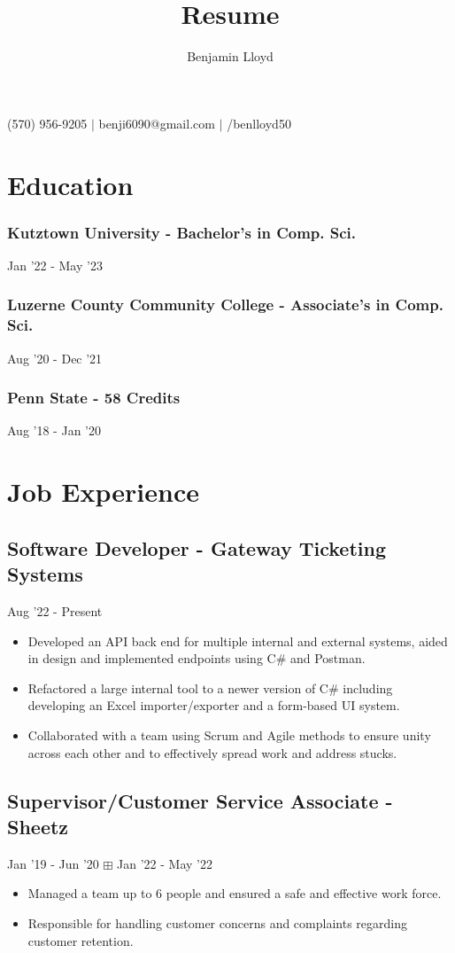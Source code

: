 \documentclass{article}
\makeatletter
\renewcommand{\maketitle}{
\begin{center}
{\huge\bfseries
\theauthor}

\vspace{.25em}

{\faPhone{}}(570) 956-9205 $\vert$ {\faInbox{}}benji6090@gmail.com $\vert$ {\faGithub{}}/benlloyd50

\end{center}
}
\makeatother
\begin{document}
\title{Resume}

\author{Benjamin Lloyd}

\maketitle

\section{Education}
\subsubsection{Kutztown University - Bachelor's in Comp. Sci.} \hfill Jan '22 - May '23

\subsubsection{Luzerne County Community College - Associate's in Comp. Sci.} \hfill Aug '20 - Dec '21

\subsubsection{Penn State - 58 Credits} \hfill Aug '18 - Jan '20

\section{Job Experience}
\subsection{Software Developer - Gateway Ticketing Systems} \hfill Aug '22 - Present

\begin{itemize}
    \item Developed an API back end for multiple internal and external systems, aided in design and implemented endpoints using C\# and Postman.
    \item Refactored a large internal tool to a newer version of C\# including developing an Excel importer/exporter and a form-based UI system.
    \item Collaborated with a team using Scrum and Agile methods to ensure unity across each other and to effectively spread work and address stucks.
\end{itemize}

\subsection{Supervisor/Customer Service Associate - Sheetz} \hfill Jan '19 - Jun '20 $\boxplus$ Jan '22 - May '22
\begin{itemize}
  \item Managed a team up to 6 people and ensured a safe and effective work force.
  \item Responsible for handling customer concerns and complaints regarding customer retention.
\end{itemize}
\end{document}
